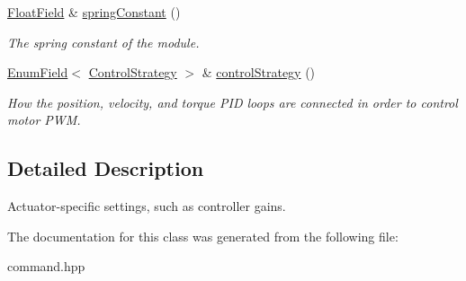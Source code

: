 \begin{DoxyCompactItemize}
\hyperlink{classhebi_1_1Command_1_1FloatField}{Float\+Field} \& \hyperlink{classhebi_1_1Command_1_1Settings_1_1Actuator_a6c88ef0c359b4e07a712e9aa32ff75c0}{spring\+Constant} ()
\begin{DoxyCompactList}\small\item\em The spring constant of the module. \end{DoxyCompactList}\item 
\mbox{\label{classhebi_1_1Command_1_1Settings_1_1Actuator_a7c08db380c5c7920255626de10bdca6d}} 
\hyperlink{classhebi_1_1Command_1_1EnumField}{Enum\+Field}$<$ \hyperlink{classhebi_1_1Command_a0f4b41003c36dee21578caddb605c64a}{Control\+Strategy} $>$ \& \hyperlink{classhebi_1_1Command_1_1Settings_1_1Actuator_a7c08db380c5c7920255626de10bdca6d}{control\+Strategy} ()
\begin{DoxyCompactList}\small\item\em How the position, velocity, and torque P\+ID loops are connected in order to control motor P\+WM. \end{DoxyCompactList}\end{DoxyCompactItemize}


\subsection{Detailed Description}
Actuator-\/specific settings, such as controller gains. 

The documentation for this class was generated from the following file\+:\begin{DoxyCompactItemize}
\item 
command.\+hpp\end{DoxyCompactItemize}
